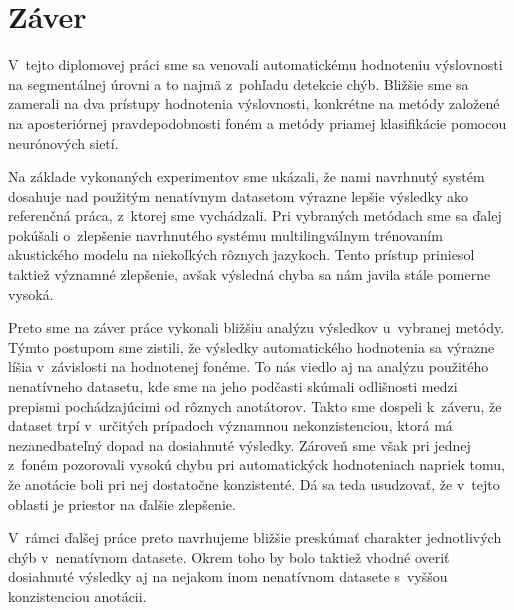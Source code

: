 
\chapter{Záver} \label{cha:conclusion}

V~tejto diplomovej práci sme sa venovali automatickému hodnoteniu výslovnosti na segmentálnej úrovni a to najmä z~pohľadu detekcie chýb. Bližšie sme sa zamerali na dva prístupy hodnotenia výslovnosti, konkrétne na metódy založené na aposteriórnej pravdepodobnosti foném a metódy priamej klasifikácie pomocou neurónových sietí.

Na základe vykonaných experimentov sme ukázali, že nami navrhnutý systém dosahuje nad použitým nenatívnym datasetom výrazne lepšie výsledky ako referenčná práca, z~ktorej sme vychádzali. Pri vybraných metódach sme sa ďalej pokúšali o~zlepšenie navrhnutého systému multilingválnym trénovaním akustického modelu na niekoľkých rôznych jazykoch. Tento prístup priniesol taktiež významné zlepšenie, avšak výsledná chyba sa nám javila stále pomerne vysoká.

Preto sme na záver práce vykonali bližšiu analýzu výsledkov u~vybranej metódy. Týmto postupom sme zistili, že výsledky automatického hodnotenia sa výrazne líšia v~závislosti na hodnotenej fonéme. To nás viedlo aj na analýzu použitého nenatívneho datasetu, kde sme na jeho podčasti skúmali odlišnosti medzi prepismi pochádzajúcimi od rôznych anotátorov. Takto sme dospeli k~záveru, že dataset trpí v~určitých prípadoch významnou nekonzistenciou, ktorá má nezanedbateľný dopad na dosiahnuté výsledky. Zároveň sme však pri jednej z~foném pozorovali vysokú chybu pri automatickýck hodnoteniach napriek tomu, že anotácie boli pri nej dostatočne konzistenté. Dá sa teda usudzovať, že v~tejto oblasti je priestor na ďalšie zlepšenie.

V~rámci ďalšej práce preto navrhujeme bližšie preskúmať charakter jednotlivých chýb v~nenatívnom datasete. Okrem toho by bolo taktiež vhodné overiť dosiahnuté výsledky aj na nejakom inom nenatívnom datasete s~vyššou konzistenciou anotácii. 


